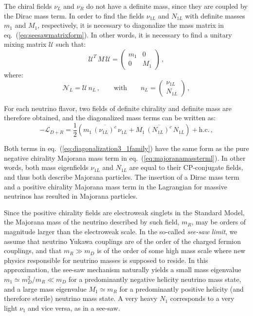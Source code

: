 The chiral fields $\nu_L$ and $\nu_R$ do not have a definite mass, since they are coupled by the Dirac mass term. In order to find the fields $\nu_{1L}$ and $N_{1L}$ with definite masses $m_1$ and $M_1$, respectively, it is necessary to diagonalize the mass matrix in eq.~(\ref{eq:seesawmatrixform}). In other words, it is necessary to find a unitary mixing matrix $\mathcal{U}$ such that:
\begin{equation}
\mathcal{U}^T \, M \, \mathcal{U} =
\begin{pmatrix}
m_1 & 0
\\
0 & M_1
\end{pmatrix}
\,,
\label{eq:diagonalization_1family}
\end{equation}
\noindent where:
\begin{equation}
\mathcal{N}_L = \mathcal{U}  \, n_L
\,,
\qquad
\text{with}
\qquad
n_L
=
\begin{pmatrix}
\nu_{1L}
\\
N_{1L}
\end{pmatrix}
\,,
\label{eq:diagonalization2_1family}
\end{equation}

 For each neutrino flavor, two fields of definite chirality and definite mass are therefore obtained, and the diagonalized mass terms can be written as:
\begin{equation}
-\mathcal{L}_{D+R}
=
\frac{1}{2}
\left(m_1 \, \overline{(\nu_{1L})^c} \, \nu_{1L} + M_1 \, \overline{(N_{1L})^c} \, N_{1L}\right) + \text{h.c.}
\,,
\label{eq:diagonalization3_1family}
\end{equation}

Both terms in eq.~(\ref{eq:diagonalization3_1family}) have the same form as the pure negative chirality Majorana mass term in eq.~(\ref{eq:majoranamassterml}). In other words, both mass eigenfields $\nu_{1L}$ and $N_{1L}$ are equal to their CP-conjugate fields, and thus both describe Majorana particles. The insertion of a Dirac mass term and a positive chirality Majorana mass term in the Lagrangian for massive neutrinos has resulted in Majorana particles.

Since the positive chirality fields are electroweak singlets in the Standard Model, the Majorana mass of the neutrino described by such field, $m_R$, may be orders of magnitude larger than the electroweak scale. In the so-called \emph{see-saw limit}, we assume that neutrino Yukawa couplings are of the order of the charged fermion couplings, and that $m_R\gg m_D$ is of the order of some high mass scale where new physics responsible for neutrino masses is supposed to reside. In this approximation, the see-saw mechanism naturally yields a small mass eigenvalue $m_1\simeq m_D^2/m_R\ll m_D$ for a predominantly negative helicity neutrino mass state, and a large mass eigenvalue $M_1\simeq m_R$ for a predominantly positive helicity (and therefore sterile) neutrino mass state. A very heavy $N_1$ corresponds to a very light $\nu_1$ and vice versa, as in a see-saw. 

